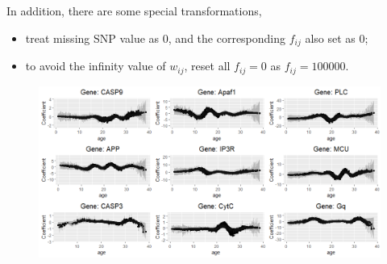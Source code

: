 In addition, there are some special transformations,

\begin{itemize}

\item treat missing SNP value as 0, and the corresponding $f_{ij}$ also set as 0;

\item to avoid the infinity value of $w_{ij}$, reset all $f_{ij} = 0$ as $f_{ij} = 100000$.

\end{itemize}




\begin{figure}[htbp] 
\centering
\includegraphics[width=1\textwidth]{Figures/3.4.png} 
\label{Fig.3.4} 
\end{figure}









